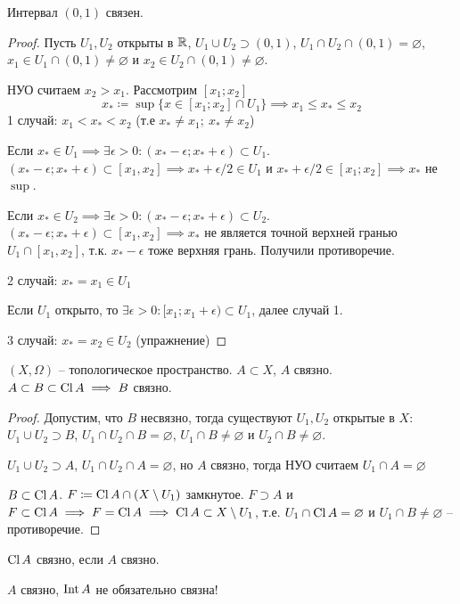 \documentclass[main]{subfiles}
\begin{document}
\begin{theorem}
    Интервал $(0,1)$ связен.
\end{theorem}
\begin{proof}
    Пусть $U_1, U_2$ открыты в $\mathbb{R}$, $U_1 \cup U_2 \supset (0,1)$, $U_1 \cap U_2 \cap (0,1) = \varnothing$,
    $x_1 \in U_1 \cap (0,1) \neq \varnothing$ и $x_2\in U_2 \cap (0,1) \neq \varnothing$.

    НУО считаем $x_2 > x_1$. Рассмотрим $[x_1; x_2]$
    \[x_* \coloneqq \sup \{x \in [x_1; x_2] \cap U_1\} \implies x_1 \le x_* \le x_2\]
    1 случай: $x_1 < x_* < x_2$ (т.е $x_* \neq x_1;\ x_* \neq x_2$)

    Если $x_* \in U_1 \implies \exists \epsilon >0 : (x_*-\epsilon; x_* + \epsilon) \subset U_1$.
    $(x_*-\epsilon; x_* + \epsilon) \subset [x_1, x_2] \implies x_* + \epsilon / 2 \in U_1$ и
    $x_* + \epsilon/2 \in [x_1; x_2] \implies x_*$ не $\sup$.

    Если $x_* \in U_2 \implies \exists \epsilon >0 : (x_*-\epsilon; x_* + \epsilon) \subset U_2$.
    $(x_*-\epsilon; x_* + \epsilon) \subset [x_1, x_2] \implies x_*$ не является точной верхней гранью
    $U_1 \cap [x_1, x_2]$, т.к. $x_* - \epsilon$ тоже верхняя грань. Получили противоречие.

    2 случай: $x_* = x_1 \in U_1$

    Если $U_1$ открыто, то $\exists \epsilon > 0 : [x_1; x_1 + \epsilon) \subset U_1$, далее случай 1.

    3 случай: $x_* = x_2 \in U_2$ (упражнение)
\end{proof}

\begin{theorem}
    $(X, \Omega)$ -- топологическое пространство. $A \subset X$, $A$ связно.
    $A \subset B \subset \operatorname{Cl} A \implies B$ связно.
\end{theorem}
\begin{proof}
    Допустим, что  $B$ несвязно, тогда существуют $U_1, U_2$ открытые в $X$:
    $U_1 \cup U_2 \supset B$, $U_1 \cap U_2 \cap B = \varnothing$,
    $U_1 \cap B \neq \varnothing$ и $U_2 \cap B \neq \varnothing$.

    $U_1 \cup U_2 \supset A$, $U_1 \cap U_2 \cap A = \varnothing$,
    но $A$ связно, тогда НУО считаем $U_1 \cap A = \varnothing$

    $B \subset \operatorname{Cl} A$. $F \coloneqq \operatorname{Cl} A \cap (X \setminus U_1)$ замкнутое.
    $F \supset A$ и $F \subset \operatorname{Cl} A \implies F = \operatorname{Cl} A \implies \operatorname{Cl} A \subset X \setminus U_1$,
    т.е. $U_1 \cap \operatorname{Cl} A = \varnothing$ и $U_1 \cap B \neq \varnothing$ -- противоречие.
\end{proof}
\begin{corollary}
    $\operatorname{Cl} A$ связно, если $A$ связно.
\end{corollary}
\begin{remark}
    $A$ связно, $\operatorname{Int} A$ не обязательно связна!
\end{remark}
\end{document}
